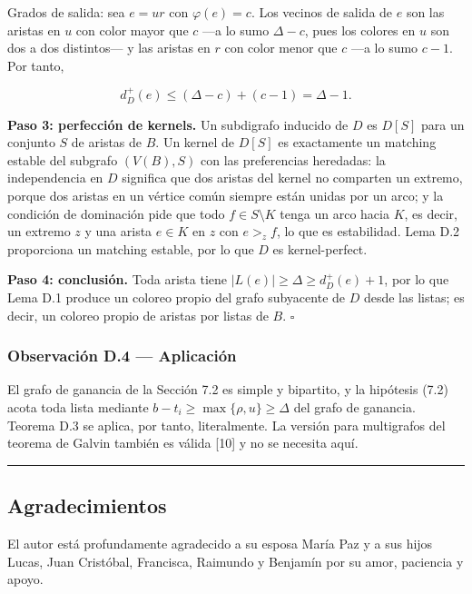 \documentclass[
  11pt,
]{article}
\begin{document}
Grados de salida: sea \(e=ur\) con \(\varphi(e)=c\). Los vecinos de
salida de \(e\) son las aristas en \(u\) con color mayor que \(c\) ---a
lo sumo \(\Delta-c\), pues los colores en \(u\) son dos a dos
distintos--- y las aristas en \(r\) con color menor que \(c\) ---a lo
sumo \(c-1\). Por tanto,

\[
d^+_D(e)\le(\Delta-c)+(c-1)=\Delta-1.
\]

\textbf{Paso 3: perfección de kernels.} Un subdigrafo inducido de \(D\)
es \(D[S]\) para un conjunto \(S\) de aristas de \(B\). Un kernel de
\(D[S]\) es exactamente un matching estable del subgrafo \((V(B),S)\)
con las preferencias heredadas: la independencia en \(D\) significa que
dos aristas del kernel no comparten un extremo, porque dos aristas en un
vértice común siempre están unidas por un arco; y la condición de
dominación pide que todo \(f\in S\setminus K\) tenga un arco hacia
\(K\), es decir, un extremo \(z\) y una arista \(e\in K\) en \(z\) con
\(e>_zf\), lo que es estabilidad. Lema D.2 proporciona un matching
estable, por lo que \(D\) es kernel-perfect.

\textbf{Paso 4: conclusión.} Toda arista tiene
\(|L(e)|\ge\Delta\ge d^+_D(e)+1\), por lo que Lema D.1 produce un
coloreo propio del grafo subyacente de \(D\) desde las listas; es decir,
un coloreo propio de aristas por listas de \(B\). \(\square\)

\subsubsection{Observación D.4 ---
Aplicación}\label{observaciuxf3n-d.4-aplicaciuxf3n}

El grafo de ganancia de la Sección 7.2 es simple y bipartito, y la
hipótesis (7.2) acota toda lista mediante
\(b-t_i\ge\max\{\rho,u\}\ge\Delta\) del grafo de ganancia. Teorema D.3
se aplica, por tanto, literalmente. La versión para multigrafos del
teorema de Galvin también es válida {[}10{]} y no se necesita aquí.

\begin{center}\rule{0.5\linewidth}{0.5pt}\end{center}

\subsection{Agradecimientos}\label{agradecimientos}

El autor está profundamente agradecido a su esposa María Paz y a sus
hijos Lucas, Juan Cristóbal, Francisca, Raimundo y Benjamín por su amor,
paciencia y apoyo.
\end{document}
